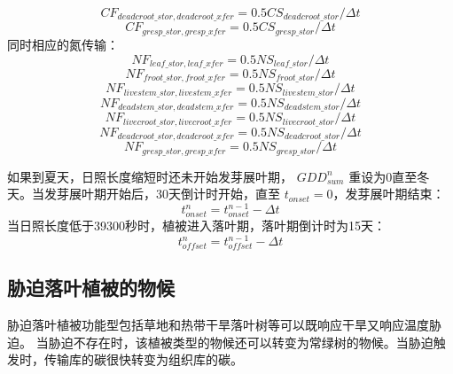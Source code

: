 \begin{equation}
  CF_{deadcroot\_{stor},deadcroot\_{xfer}} = 0.5 CS_{deadcroot\_{stor}}/\Delta t
\end{equation}
\begin{equation}
  CF_{gresp\_{stor},gresp\_{xfer}} = 0.5  CS_{gresp\_{stor}}/\Delta t
\end{equation}
同时相应的氮传输：
\begin{equation}
NF_{leaf\_{stor},leaf\_{xfer}} = 0.5  NS_{leaf\_{stor}}/\Delta t
\end{equation}
%
\begin{equation}
  NF_{froot\_{stor},froot\_{xfer}} = 0.5  NS_{froot\_{stor}}/\Delta t
\end{equation}
%
\begin{equation}
  NF_{livestem\_{stor},livestem\_{xfer}} = 0.5  NS_{livestem\_{stor}}/\Delta t
\end{equation}
%
\begin{equation}
  NF_{deadstem\_{stor},deadstem\_{xfer}} = 0.5 NS_{deadstem\_{stor}}/\Delta t
\end{equation}
%
\begin{equation}
  NF_{livecroot\_{stor},livecroot\_{xfer}} = 0.5  NS_{livecroot\_{stor}}/\Delta t
\end{equation}
%
\begin{equation}
  NF_{deadcroot\_{stor},deadcroot\_{xfer}} = 0.5 NS_{deadcroot\_{stor}}/\Delta t
\end{equation}
%
\begin{equation}
  NF_{gresp\_{stor},gresp\_{xfer}} = 0.5 NS_{gresp\_{stor}}/\Delta t
\end{equation}


如果到夏天，日照长度缩短时还未开始发芽展叶期，
$GDD_{sum}^n$ 重设为0直至冬天。当发芽展叶期开始后，30天倒计时开始，直至 $t_{onset}=0$，发芽展叶期结束：
%
\begin{equation}
t_{onset}^n=t_{onset}^{n-1}-\Delta t
\end{equation}
当日照长度低于39300秒时，植被进入落叶期，落叶期倒计时为15天：
\begin{equation}
  t_{offset}^n=t_{offset}^{n-1}-\Delta t
\end{equation}


\subsection{胁迫落叶植被的物候}

胁迫落叶植被功能型包括草地和热带干旱落叶树等可以既响应干旱又响应温度胁迫。
当胁迫不存在时，该植被类型的物候还可以转变为常绿树的物候。当胁迫触发时，传输库的碳很快转变为组织库的碳。


